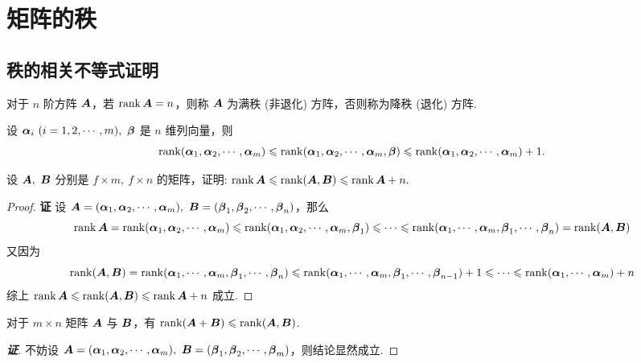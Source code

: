 \section{矩阵的秩}

\subsection{秩的相关不等式证明}

\begin{definition}[满秩方阵]
    对于 $n$ 阶方阵 $\vb*{A}$，若 $\rank\vb*{A}=n$，则称 $\vb*{A}$ 为满秩 (非退化) 方阵，否则称为降秩 (退化) 方阵.
\end{definition}

\begin{theorem}[矩阵与向量组秩的联系]
    设 $\vb*{\alpha}_i~ (i=1,2,\cdots,m),~\vb*{\beta}$ 是 $n$ 维列向量，则
    $$\rank(\vb*{\alpha}_1,\vb*{\alpha}_2,\cdots,\vb*{\alpha}_m)\leqslant \rank(\vb*{\alpha}_1,\vb*{\alpha}_2,\cdots,\vb*{\alpha}_m,\vb*{\beta})\leqslant \rank(\vb*{\alpha}_1,\vb*{\alpha}_2,\cdots,\vb*{\alpha}_m)+1.$$
\end{theorem}

\begin{example}
    设 $\vb*{A},~\vb*{B}$ 分别是 $f\times m,~f\times n$ 的矩阵，证明: $\rank\vb*{A}\leqslant \rank(\vb*{A},\vb*{B})\leqslant \rank\vb*{A}+n.$
\end{example}
\begin{proof}{\songti \textbf{证}}
    设 $\vb*{A}=(\vb*{\alpha}_1,\vb*{\alpha}_2,\cdots,\vb*{\alpha}_m),~\vb*{B}=(\vb*{\beta}_1,\vb*{\beta}_2,\cdots,\vb*{\beta}_n)$，那么 
    $$\rank\vb*{A}=\rank(\vb*{\alpha}_1,\vb*{\alpha}_2,\cdots,\vb*{\alpha}_m)\leqslant \rank(\vb*{\alpha}_1,\vb*{\alpha}_2,\cdots,\vb*{\alpha}_m,\vb*{\beta}_1)\leqslant\cdots\leqslant \rank(\vb*{\alpha}_1,\cdots,\vb*{\alpha}_m,\vb*{\beta}_1,\cdots,\vb*{\beta}_n)=\rank(\vb*{A},\vb*{B})$$
    又因为 
    $$\rank(\vb*{A},\vb*{B})=\rank(\vb*{\alpha}_1,\cdots,\vb*{\alpha}_m,\vb*{\beta}_1,\cdots,\vb*{\beta}_n)\leqslant \rank(\vb*{\alpha}_1,\cdots,\vb*{\alpha}_m,\vb*{\beta}_1,\cdots,\vb*{\beta}_{n-1})+1\leqslant \cdots\leqslant \rank(\vb*{\alpha}_1,\cdots,\vb*{\alpha}_m)+n$$
    综上 $\rank\vb*{A}\leqslant \rank(\vb*{A},\vb*{B})\leqslant \rank\vb*{A}+n$ 成立.
\end{proof}

\begin{theorem}
    对于 $m\times n$ 矩阵 $\vb*{A}$ 与 $\vb*{B}$，有 $\rank(\vb*{A}+\vb*{B})\leqslant \rank(\vb*{A},\vb*{B})$.
\end{theorem}
\begin{proof}[{\songti \textbf{证}}]
    不妨设 $\vb*{A}=(\vb*{\alpha}_1,\vb*{\alpha}_2,\cdots,\vb*{\alpha}_m),~\vb*{B}=(\vb*{\beta}_1,\vb*{\beta}_2,\cdots,\vb*{\beta}_m)$，则结论显然成立.
\end{proof}

